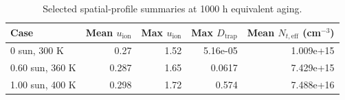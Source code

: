 \begin{table}[H]
\centering
\caption{Selected spatial-profile summaries at 1000 h equivalent aging.}
\label{tab:spatial_profile_summary}
\begin{tabular}{@{}lrrrr@{}}
\toprule
Case & Mean $u_{\mathrm{ion}}$ & Max $u_{\mathrm{ion}}$ & Max $D_{\mathrm{trap}}$ & Mean $N_{t,\mathrm{eff}}$ (cm$^{-3}$) \\
\midrule
0 sun, 300 K & 0.27 & 1.52 & 5.16e-05 & 1.009e+15 \\
0.60 sun, 360 K & 0.287 & 1.65 & 0.0617 & 7.429e+15 \\
1.00 sun, 400 K & 0.298 & 1.72 & 0.574 & 7.488e+16 \\
\bottomrule
\end{tabular}
\end{table}
